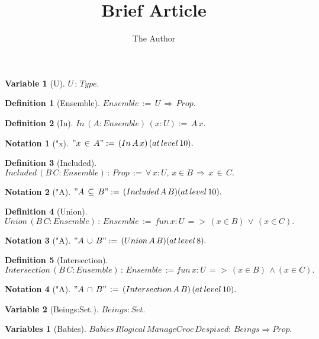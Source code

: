 \documentclass[11pt, oneside]{article}
\title{Brief Article}
\author{The Author}
\date{}							%
\newtheorem{Definition}{Definition}
\newtheorem{Variable}{Variable}
\newtheorem{Variables}{Variables}
\newtheorem{Notation}{Notation}
\begin{document}
\maketitle

\begin{Variable}[U] \label{Variable:U}
$U\,:\,Type.$
 \end{Variable}
\begin{Definition}[Ensemble] \label{Definition:Ensemble}
$Ensemble\,:=\,U\,\Rightarrow \,Prop.$
 \end{Definition}
\begin{Definition}[In] \label{Definition:In}
$In\,(A:Ensemble)\,(x:U):=\,A\,x.$
 \end{Definition}
\begin{Notation}["x] \label{Notation:"x}
$"x\,\in \,A":=\,(In\,A\,x)\,(at\,level\,10).$
 \end{Notation}
\begin{Definition}[Included] \label{Definition:Included}
$Included\,(B\,C:Ensemble)\,:\,Prop\,:=\,\forall \,x:U,\,x\in B\,\Rightarrow \,x\,\in \,C.$
 \end{Definition}
\begin{Notation}["A] \label{Notation:"A}
$"A\,\subseteq \,B":=\,(Included\,A\,B)(at\,level\,10).$
 \end{Notation}
\begin{Definition}[Union] \label{Definition:Union}
$Union\,(B\,C:Ensemble)\,:\,Ensemble\,:=\,fun\,x:U\,=>\,(x\in B)\,\lor \,(x\in C).$
 \end{Definition}
\begin{Notation}["A] \label{Notation:"A}
$"A\,\cup \,B":=\,(Union\,A\,B)(at\,level\,8).$
 \end{Notation}
\begin{Definition}[Intersection] \label{Definition:Intersection}
$Intersection\,(B\,C:Ensemble)\,:\,Ensemble\,:=fun\,x:U\,=>\,(x\in B)\,\land (x\in C).$
 \end{Definition}
\begin{Notation}["A] \label{Notation:"A}
$"A\,\cap \,B"\,:=\,(Intersection\,A\,B)\,(at\,level\,10).$
 \end{Notation}
\begin{Variable}[Beings:Set.] \label{Variable:Beings:Set.}
$Beings:Set.$
 \end{Variable}
\begin{Variables}[Babies] \label{Variables:Babies}
$Babies\,Illogical\,ManageCroc\,Despised:\,Beings\Rightarrow Prop.$
 \end{Variables}
\end{document}
